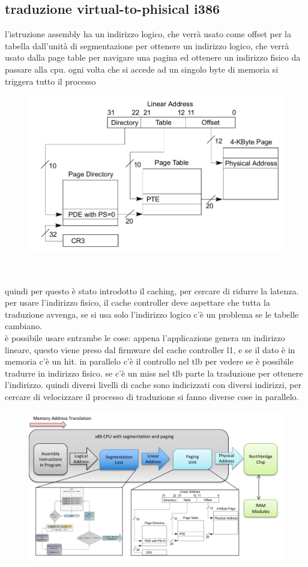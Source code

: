 \documentclass[12pt, oneside]{extbook} %
\begin{document}
\subsection{traduzione virtual-to-phisical i386}
l'istruzione assembly ha un indirizzo logico, che verrà usato come offset per la tabella dall'unità di segmentazione per ottenere un indirizzo logico, che verrà usato dalla page table per navigare una pagina ed ottenere un indirizzo fisico da passare alla cpu. ogni volta che si accede ad un singolo byte di memoria si triggera tutto il processo\\
\begin{figure}
	\includegraphics[scale=0.4]{immagini/i386_paging.png}
\end{figure}
\\\\
quindi per questo è stato introdotto il caching, per cercare di ridurre la latenza. per usare l'indirizzo fisico, il cache controller deve aspettare che tutta la traduzione avvenga, se si usa solo l'indirizzo logico c'è un problema se le tabelle cambiano.\\ è possibile usare entrambe le cose: appena l'applicazione genera un indirizzo lineare, questo viene preso dal firmware del cache controller l1, e se il dato è in memoria c'è un hit. in parallelo c'è il controllo nel tlb per vedere se è possibile tradurre in indirizzo fisico. se c'è un miss nel tlb parte la traduzione per ottenere l'indirizzo. quindi diversi livelli di cache sono indicizzati con diversi indirizzi, per cercare di velocizzare il processo di traduzione si fanno diverse cose in parallelo.
\begin{figure}[!h]
	\includegraphics[scale=0.3]{immagini/vtp_riassunto.png}
\end{figure}
\end{document}
